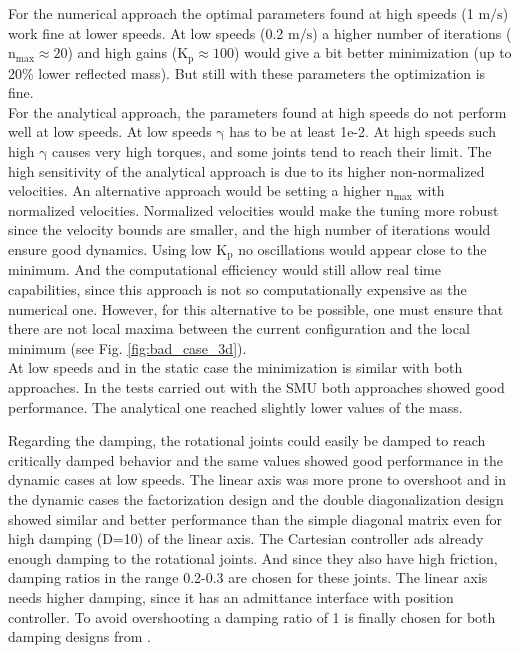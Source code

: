 For the numerical approach the optimal parameters found at high speeds (1 $\mathrm{m/s}$) work fine at lower speeds. At low speeds (0.2 $\mathrm{m/s}$) a higher number of iterations ($\mathrm{n_{max} \approx 20}$) and high gains ($\mathrm{K_p \approx 100}$) would give a bit better minimization (up to 20\% lower reflected mass). But still with these parameters the optimization is fine. \\
%
 For the analytical approach, the parameters found at high speeds do not perform well at low speeds. At low speeds  $\mathrm{\gamma}$ has to be at least 1e-2. At high speeds such high $\mathrm{\gamma}$ causes very high torques, and some joints tend to reach their limit. The high sensitivity of the analytical approach is due to its higher non-normalized velocities. An alternative approach would be setting a higher $\mathrm{n_{max}}$ with normalized velocities. Normalized velocities would make the tuning more robust since the velocity bounds are smaller, and the high number of iterations would ensure good dynamics. Using low $\mathrm{K_p}$  no oscillations would appear close to the minimum. And the computational efficiency would still allow real time capabilities, since this approach is not so computationally expensive as the numerical one.   
 However, for this alternative to be possible, one must ensure that there are not local maxima between the current configuration and the local minimum (see Fig. \ref{fig:bad_case_3d}).\\
%
At low speeds and in the static case the minimization is similar with both approaches. In the tests carried out with the SMU both approaches showed good performance. The analytical one reached slightly lower values of the mass. 


Regarding the damping, the rotational joints could easily be damped to reach critically damped behavior and the same values showed good performance in the dynamic cases at low speeds. The linear axis was more prone to overshoot and in the dynamic cases the factorization design and the double diagonalization design showed similar and better performance than the simple diagonal matrix even for high damping (D=10) of the linear axis. 
The Cartesian controller ads already enough damping to the rotational joints. And since they also have high friction, damping ratios in the range 0.2-0.3 are chosen for these joints. The linear axis needs higher damping, since it has an admittance interface with position controller. To avoid overshooting a damping ratio of 1 is finally chosen for both damping designs from \cite{alin_damping}.



